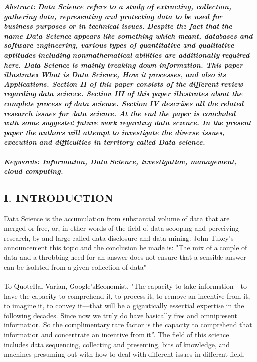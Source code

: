 \documentclass[a4paper]{article}
\begin{document}
  
\begin{multicols}{2}
\noindent \textit{\textbf{Abstract: Data Science refers to a study of extracting,
collection, gathering data, representing and protecting data
to be used for business purposes or in technical issues.
Despite the fact that the name Data Science appears like
something which meant, databases and software engineering,
various types of quantitative and qualitative aptitudes
including nonmathematical abilities are additionally required
here. Data Science is mainly breaking down information.
This paper illustrates What is Data Science, How it
processes, and also its Applications. Section II of this paper
consists of the different review regarding data science.
Section III of this paper illustrates about the complete
process of data science. Section IV describes all the related
research issues for data science. At the end the paper is
concluded with some suggested future work regarding data
science. In the present paper the authors will attempt to
investigate the diverse issues, execution and difficulties in
territory called Data science. \\ \\
Keywords: Information, Data Science, investigation,
management, cloud computing.}}

\subsection*{I. INTRODUCTION}
Data Science is the accumulation from substantial volume of
data that are merged or free, or, in other words of the field of
data scooping and perceiving research, by and large called data
disclosure and data mining. John Tukey's announcement this
topic and the conclusion he made is: "The mix of a couple of
data and a throbbing need for an answer does not ensure that a
sensible answer can be isolated from a given collection of
data". \\ \\
To QuoteHal Varian, Google'sEconomist, "The capacity to
take information—to have the capacity to comprehend it, to
process it, to remove an incentive from it, to imagine it, to
convey it—that will be a gigantically essential expertise in the
following decades. Since now we truly do have basically free
and omnipresent information. So the complimentary rare factor
is the capacity to comprehend that information and concentrate
an incentive from it”. The field of this science includes data
sequencing, collecting and presenting, bits of knowledge, and
machines presuming out with how to deal with different issues
in different field.


\end{multicols}
\end{document}
